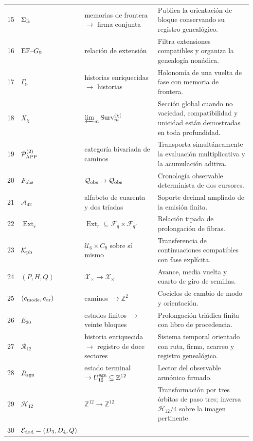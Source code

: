 {\begin{longtable}{@{}r p{}p{}p{}@{}}
15&\(\Sigma_{\rm B}\)&memorias de frontera \(\to\) firma conjunta&
Publica la orientación de bloque conservando su registro genealógico.\\
16&\({\rm EF}\text{--}G_9\)&relación de extensión&
Filtra extensiones compatibles y organiza la genealogía nonádica.\\
17&\(\Gamma_9\)&historias enriquecidas \(\longrightarrow\) historias&
Holonomía de una vuelta de fase con memoria de frontera.\\
18&\(X_\chi\)&\(\varprojlim_m\operatorname{Surv}^{(\chi)}_m\)&
Sección global cuando no vaciedad, compatibilidad y unicidad están
demostradas en toda profundidad.\\
19&\(\mathcal P_{\rm APP}^{(2)}\)&categoría bivariada de caminos&
Transporta simultáneamente la evaluación multiplicativa y la acumulación
aditiva.\\
20&\(F_{\rm obs}\)&\(\mathcal Q_{\rm obs}\to\mathcal Q_{\rm obs}\)&
Cronología observable determinista de dos cursores.\\
21&\(\mathcal A_{42}\)&alfabeto de cuarenta y dos tríadas&
Soporte decimal ampliado de la emisión finita.\\
22&\(\operatorname{Ext}_r\)&
\(\operatorname{Ext}_r\subseteq\mathcal F_q\times\mathcal F_{q'}\)&
Relación tipada de prolongación de fibras.\\
23&\(\mathcal K_{\rm ph}\)&\(\mathcal U_6\times C_9\) sobre sí mismo&
Transferencia de continuaciones compatibles con fase explícita.\\
24&\((P,H,Q)\)&\(\mathcal X_\times\to\mathcal X_\times\)&
Avance, media vuelta y cuarto de giro de semillas.\\
25&\((c_{\rm mode},c_{\rm or})\)&caminos \(\to\mathbb Z^2\)&
Cociclos de cambio de modo y orientación.\\
26&\(E_{20}\)&estados finitos \(\to\) veinte bloques&
Prolongación triádica finita con libro de procedencia.\\
27&\(\mathcal R_{12}\)&historia enriquecida \(\to\) registro de doce
sectores&
Sistema temporal orientado con ruta, firma, acarreo y registro genealógico.\\
28&\(R_{\rm sgn}\)&estado terminal \(\to U_{12}^{\rm sgn}
\subseteq\mathbb Z^{12}\)&
Lector del observable armónico firmado.\\
29&\(\mathcal H_{12}\)&\(\mathbb Z^{12}\to\mathbb Z^{12}\)&
Transformación por tres órbitas de paso tres; inversa
\(\mathcal H_{12}/4\) sobre la imagen pertinente.\\
30&\(\mathcal E_{\rm dod}=(D_3,D_4,Q)\)&

\end{longtable}}
